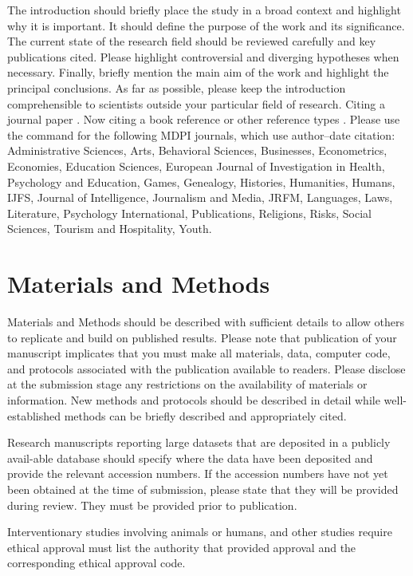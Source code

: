 \documentclass[preprints,article,submit,pdftex,moreauthors]{Definitions/mdpi}
\begin{document}
The introduction should briefly place the study in a broad context and highlight why it is important. It should define the purpose of the work and its significance. The current state of the research field should be reviewed carefully and key publications cited. Please highlight controversial and diverging hypotheses when necessary. Finally, briefly mention the main aim of the work and highlight the principal conclusions. As far as possible, please keep the introduction comprehensible to scientists outside your particular field of research. Citing a journal paper  \cite{ref-journal}.  Now citing a book reference  \cite{ref-book1,ref-book2} or other reference types  \cite{ref-unpublish,ref-url}. Please use the command  \cite{ref-proceeding,ref-thesis} for the following MDPI journals, which use author--date citation: Administrative Sciences, Arts, Behavioral Sciences, Businesses, Econometrics, Economies, Education Sciences, European Journal of Investigation in Health, Psychology and Education, Games, Genealogy, Histories, Humanities, Humans, IJFS, Journal of Intelligence, Journalism and Media, JRFM, Languages, Laws, Literature, Psychology International, Publications, Religions, Risks, Social Sciences, Tourism and Hospitality, Youth. 

\section{Materials and Methods}

Materials and Methods should be described with sufficient details to allow others to replicate and build on published results. Please note that publication of your manuscript implicates that you must make all materials, data, computer code, and protocols associated with the publication available to readers. Please disclose at the submission stage any restrictions on the availability of materials or information. New methods and protocols should be described in detail while well-established methods can be briefly described and appropriately cited.

Research manuscripts reporting large datasets that are deposited in a publicly avail-able database should specify where the data have been deposited and provide the relevant accession numbers. If the accession numbers have not yet been obtained at the time of submission, please state that they will be provided during review. They must be provided prior to publication.

Interventionary studies involving animals or humans, and other studies require ethical approval must list the authority that provided approval and the corresponding ethical approval code.
\end{document}
